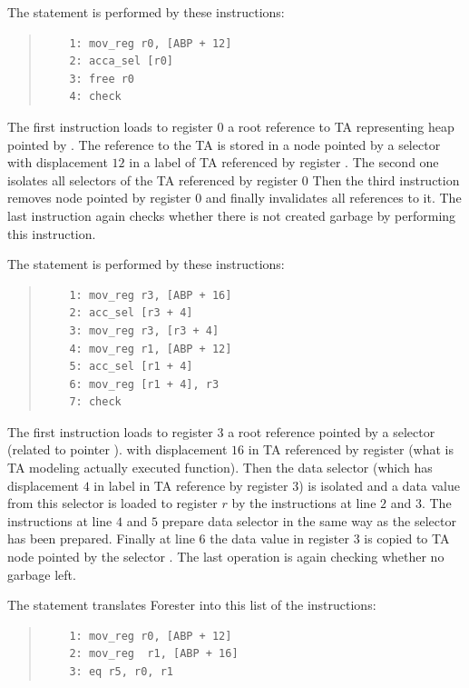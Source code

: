 \bexmp
	The statement  is performed by these instructions:
	\begin{quote}
	\begin{verbatim}
	1: mov_reg r0, [ABP + 12]
	2: acca_sel [r0]
	3: free r0
	4: check
	\end{verbatim}
	\end{quote}

	The first instruction loads to register $0$ a root reference to TA representing heap pointed by .
	The reference to the TA is stored in a node pointed by a selector with displacement $12$
	in a label of TA referenced by register .
	The second one isolates all selectors of the TA referenced by register $0$
	Then the third instruction removes node pointed by register $0$
	and finally invalidates all references to it.
	The last instruction again checks whether there is not created garbage by performing this instruction.

\eexmp

\bexmp
	The statement  is performed by these instructions:
	\begin{quote}
	\begin{verbatim}
	1: mov_reg r3, [ABP + 16]
	2: acc_sel [r3 + 4]
	3: mov_reg r3, [r3 + 4]
	4: mov_reg r1, [ABP + 12]
	5: acc_sel [r1 + 4]
	6: mov_reg [r1 + 4], r3
	7: check
	\end{verbatim}
	\end{quote}

	The first instruction loads to register $3$ a root reference pointed by a selector (related to pointer ).
	with displacement $16$ in TA referenced by register  (what is TA modeling actually executed function).
	Then the data selector  (which has displacement $4$ in label in TA reference by register $3$)
	is isolated and a data value from this selector	is loaded to register $r$ by the instructions at line $2$ and $3$.
	The instructions at line $4$ and $5$ prepare data selector  in the same way
	as the selector  has been prepared.
	Finally at line $6$ the data value in register $3$ is copied to TA node pointed by
	the selector .
	The last operation is again checking whether no garbage left.
\eexmp

\bexmp
	The statement  translates Forester into this list of the instructions:
	\begin{quote}
	\begin{verbatim}
	1: mov_reg r0, [ABP + 12]
	2: mov_reg	r1, [ABP + 16]
	3: eq r5, r0, r1
	\end{verbatim}
	\end{quote}

